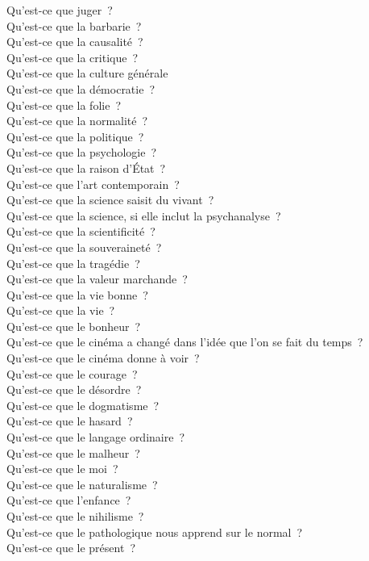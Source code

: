 \documentclass[a4paper,12pt]{article}
\begin{document}
Qu'est-ce que juger ? \\
Qu'est-ce que la barbarie ? \\
Qu'est-ce que la causalité ? \\
Qu'est-ce que la critique ? \\
Qu'est-ce que la culture générale \\
Qu'est-ce que la démocratie ? \\
Qu'est-ce que la folie ? \\
Qu'est-ce que la normalité ? \\
Qu'est-ce que la politique ? \\
Qu'est-ce que la psychologie ? \\
Qu'est-ce que la raison d'État ? \\
Qu'est-ce que l'art contemporain ? \\
Qu'est-ce que la science saisit du vivant ? \\
Qu'est-ce que la science, si elle inclut la psychanalyse ? \\
Qu'est-ce que la scientificité ? \\
Qu'est-ce que la souveraineté ? \\
Qu'est-ce que la tragédie ? \\
Qu'est-ce que la valeur marchande ? \\
Qu'est-ce que la vie bonne ? \\
Qu'est-ce que la vie ? \\
Qu'est-ce que le bonheur ? \\
Qu'est-ce que le cinéma a changé dans l'idée que l'on se fait du temps ? \\
Qu'est-ce que le cinéma donne à voir ? \\
Qu'est-ce que le courage ? \\
Qu'est-ce que le désordre ? \\
Qu'est-ce que le dogmatisme ? \\
Qu'est-ce que le hasard ? \\
Qu'est-ce que le langage ordinaire ? \\
Qu'est-ce que le malheur ? \\
Qu'est-ce que le moi ? \\
Qu'est-ce que le naturalisme ? \\
Qu'est-ce que l'enfance ? \\
Qu'est-ce que le nihilisme ? \\
Qu'est-ce que le pathologique nous apprend sur le normal ? \\
Qu'est-ce que le présent ? \\
\end{document}
